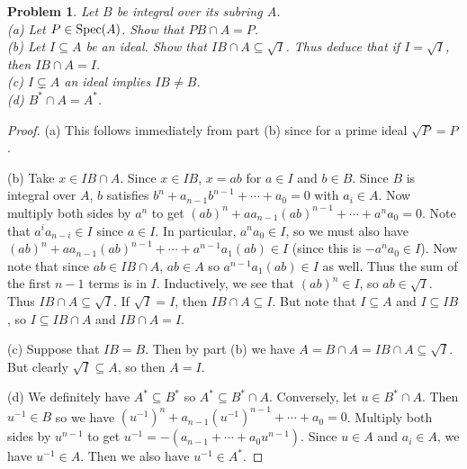 \documentclass{article}
\newcommand{\spec}{\textup{Spec}}
\newtheorem{problem}{Problem}
\begin{document}
\begin{problem}
Let $B$ be integral over its subring $A$.\\
(a) Let $P \in \spec(A)$. Show that $PB \cap A = P$.\\
(b) Let $I \subseteq A$ be an ideal. Show that $IB \cap A \subseteq \sqrt{I}$. Thus deduce that if $I = \sqrt{I}$, then $IB \cap A = I$.\\
(c) $I \subsetneq A$ an ideal implies $IB \neq B$.\\
(d) $B^* \cap A = A^*$.
\end{problem}
\begin{proof}
(a) This follows immediately from part (b) since for a prime ideal $\sqrt{P} = P$.

(b) Take $x \in IB \cap A$. Since $x \in IB$, $x = ab$ for $a \in I$ and $b \in B$. Since $B$ is integral over $A$, $b$ satisfies $b^n + a_{n-1}b^{n-1} + \cdots + a_0 = 0$ with $a_i \in A$. Now multiply both sides by $a^n$ to get $(ab)^n + aa_{n-1}(ab)^{n-1} + \cdots + a^na_0 = 0$. Note that $a^ia_{n-i} \in I$ since $a \in I$. In particular, $a^na_0 \in I$, so we must also have $(ab)^n + aa_{n-1}(ab)^{n-1} + \cdots + a^{n-1}a_1(ab) \in I$ (since this is $-a^na_0 \in I$). Now note that since $ab \in IB \cap A$, $ab \in A$ so $a^{n-1}a_1(ab) \in I$ as well. Thus the sum of the first $n-1$ terms is in $I$. Inductively, we see that $(ab)^n \in I$, so $ab \in \sqrt{I}$. Thus $IB \cap A \subseteq \sqrt{I}$. If $\sqrt{I} = I$, then $IB \cap A \subseteq I$. But note that $I \subseteq A$ and $I \subseteq IB$, so $I \subseteq IB \cap A$ and $IB \cap A = I$.

(c) Suppose that $IB = B$. Then by part (b) we have $A = B \cap A = IB \cap A \subseteq \sqrt{I}$. But clearly $\sqrt{I} \subseteq A$, so then $A = I$.

(d) We definitely have $A^* \subseteq B^*$ so $A^* \subseteq B^* \cap A$. Conversely, let $u \in B^* \cap A$. Then $u^{-1} \in B$ so we have $(u^{-1})^n + a_{n-1}(u^{-1})^{n-1} + \cdots + a_0 = 0$. Multiply both sides by $u^{n-1}$ to get $u^{-1} = -(a_{n-1} + \cdots + a_0u^{n-1})$. Since $u \in A$ and $a_i \in A$, we have $u^{-1} \in A$. Then we also have $u^{-1} \in A^*$.
\end{proof}
\end{document}
